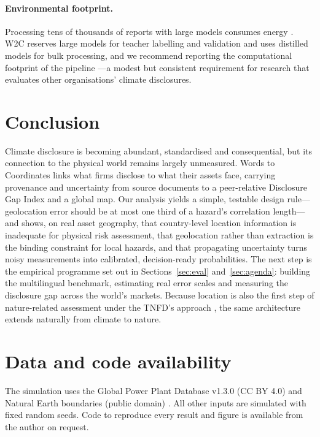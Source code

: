 \documentclass{article}
\theoremstyle{plain}
\theoremstyle{definition}
\begin{document}
\paragraph{Environmental footprint.} Processing tens of thousands of reports with large models consumes energy \citep{strubell2019energy}. W2C reserves large models for teacher labelling and validation and uses distilled models for bulk processing, and we recommend reporting the computational footprint of the pipeline \citep{lacoste2019quantifying}---a modest but consistent requirement for research that evaluates other organisations' climate disclosures.

\section{Conclusion}
\label{sec:conclusion}

Climate disclosure is becoming abundant, standardised and consequential, but its connection to the physical world remains largely unmeasured. Words to Coordinates links what firms disclose to what their assets face, carrying provenance and uncertainty from source documents to a peer-relative Disclosure Gap Index and a global map. Our analysis yields a simple, testable design rule---geolocation error should be at most one third of a hazard's correlation length---and shows, on real asset geography, that country-level location information is inadequate for physical risk assessment, that geolocation rather than extraction is the binding constraint for local hazards, and that propagating uncertainty turns noisy measurements into calibrated, decision-ready probabilities. The next step is the empirical programme set out in Sections~\ref{sec:eval} and~\ref{sec:agenda}: building the multilingual benchmark, estimating real error scales and measuring the disclosure gap across the world's markets. Because location is also the first step of nature-related assessment under the TNFD's approach \citep{tnfd2023}, the same architecture extends naturally from climate to nature.

\section*{Data and code availability}
The simulation uses the Global Power Plant Database v1.3.0 (CC BY 4.0) \citep{byers2018gppd} and Natural Earth boundaries (public domain) \citep{naturalearth2024}. All other inputs are simulated with fixed random seeds. Code to reproduce every result and figure is available from the author on request.
\end{document}

